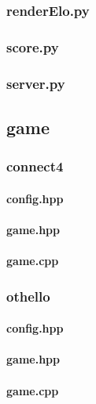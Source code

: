 \documentclass[12pt]{article}
\newcommand{\incFile}[2]{\label{code:#2}\newpage}
\begin{document}
\subsubsection{renderElo.py}										\incFile{python}{elo/renderElo.py}
\subsubsection{score.py}												\incFile{python}{elo/score.py}
\subsubsection{server.py}												\incFile{python}{elo/server.py}

\subsection{game}															%
\subsubsection{connect4}
\paragraph{config.hpp}													\incFile{C++}{games/connect4/config.hpp}
\paragraph{game.hpp}													\incFile{C++}{games/connect4/game.hpp}
\paragraph{game.cpp}													\incFile{C++}{games/connect4/game.cpp}
\subsubsection{othello}													%
\paragraph{config.hpp}													\incFile{C++}{games/othello/config.hpp}
\paragraph{game.hpp}													\incFile{C++}{games/othello/game.hpp}
\paragraph{game.cpp}													\incFile{C++}{games/othello/game.cpp}
\end{document}
